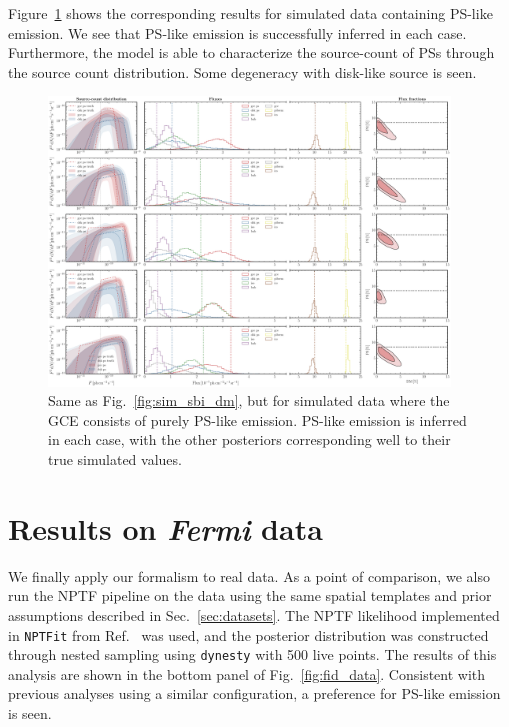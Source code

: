 \documentclass[prd,aps,10pt,nofootinbib,twocolumn,superscriptaddress,preprintnumbers,balancelastpage,longbibliography]{revtex4-1}
\begin{document}
Figure~\ref{fig:sim_sbi_ps} shows the corresponding results for simulated data containing PS-like emission. We see that PS-like emission is successfully inferred in each case. Furthermore, the model is able to characterize the source-count of PSs through the source count distribution. Some degeneracy with disk-like source is seen.

%
\begin{figure}
    \centering
    \includegraphics[width=0.95\textwidth]{plots/sim_sbi_ps.pdf}
    \caption{Same as Fig.~\ref{fig:sim_sbi_dm}, but for simulated data where the GCE consists of purely PS-like emission. PS-like emission is inferred in each case, with the other posteriors corresponding well to their true simulated values.}
    \label{fig:sim_sbi_ps}
\end{figure}
%

\section{Results on \emph{Fermi} data}
\label{sec:data}

We finally apply our formalism to real \Fermi data. As a point of comparison, we also run the NPTF pipeline on the data using the same spatial templates and prior assumptions described in Sec.~\ref{sec:datasets}. The NPTF likelihood implemented in \texttt{NPTFit} from Ref.~\cite{Mishra-Sharma:2016gis} was used, and the posterior distribution was constructed through nested sampling using \texttt{dynesty} with 500 live points. The results of this analysis are shown in the bottom panel of Fig.~\ref{fig:fid_data}. Consistent with previous analyses using a similar configuration, a preference for PS-like emission is seen.
\end{document}
